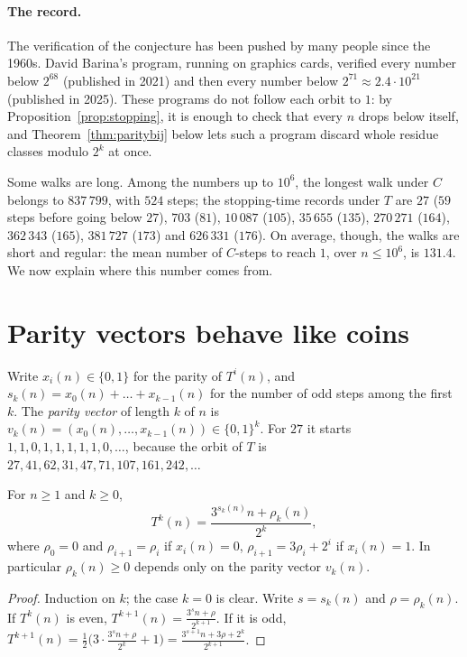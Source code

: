 \paragraph{The record.} The verification of the conjecture has been pushed by many people since the 1960s. David Barina's program, running on graphics cards, verified every number below $2^{68}$ (published in
2021) and then every number below $2^{71}\approx2.4\cdot10^{21}$ (published in 2025). These programs do not follow each orbit to $1$: by
Proposition~\ref{prop:stopping}, it is enough to check that every $n$ drops below itself, and Theorem~\ref{thm:paritybij} below lets such a
program discard whole residue classes modulo $2^k$ at once.

Some walks are long. Among the numbers up to $10^6$, the longest walk under $C$ belongs to $837\,799$, with $524$ steps; the stopping-time records under
$T$ are $27$ ($59$ steps before going below $27$), $703$ ($81$), $10\,087$ ($105$), $35\,655$ ($135$), $270\,271$ ($164$), $362\,343$ ($165$), $381\,727$
($173$) and $626\,331$ ($176$). On average, though, the walks are short and regular: the mean number of $C$-steps to reach $1$, over $n\le10^6$, is
$131.4$. We now explain where this number comes from.

\section{Parity vectors behave like coins}

Write $x_i(n)\in\{0,1\}$ for the parity of $T^i(n)$, and $s_k(n)=x_0(n)+\dots+x_{k-1}(n)$ for the number of odd steps among the first $k$. The
\emph{parity vector} of length $k$ of $n$ is $v_k(n)=(x_0(n),\dots,x_{k-1}(n))\in\{0,1\}^k$. For $27$ it starts $1,1,0,1,1,1,1,1,0,\dots$, because the orbit of $T$ is $27,41,62,31,47,71,107,161,242,\dots$

\begin{lemma}\label{lem:affine}
For $n\ge1$ and $k\ge0$,
\[
T^k(n)=\frac{3^{s_k(n)}n+\rho_k(n)}{2^k},
\]
where $\rho_0=0$ and $\rho_{i+1}=\rho_i$ if $x_i(n)=0$, $\rho_{i+1}=3\rho_i+2^i$ if $x_i(n)=1$. In particular $\rho_k(n)\ge0$ depends only on the parity
vector $v_k(n)$.
\end{lemma}
\begin{proof}
Induction on $k$; the case $k=0$ is clear. Write $s=s_k(n)$ and $\rho=\rho_k(n)$. If $T^k(n)$ is even, $T^{k+1}(n)=\frac{3^sn+\rho}{2^{k+1}}$. If it is odd,
$T^{k+1}(n)=\frac12\bigl(3\cdot\frac{3^sn+\rho}{2^k}+1\bigr)=\frac{3^{s+1}n+3\rho+2^k}{2^{k+1}}$.
\end{proof}

